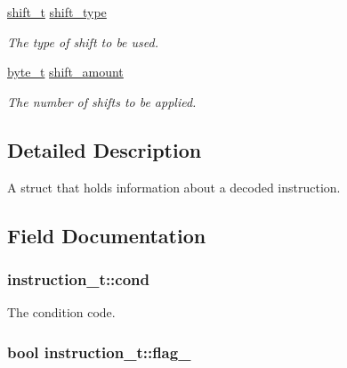 \begin{DoxyCompactItemize}
\hyperlink{global_8h_a22746cb89e8b2ed0a61876e36446f37f}{shift\+\_\+t} \hyperlink{structinstruction__t_a13483a9191b2197c4ed899f3889ad801}{shift\+\_\+type}
\begin{DoxyCompactList}\small\item\em The type of shift to be used. \end{DoxyCompactList}\item 
\hyperlink{global_8h_a0661d7d1353e0bca70c64563f635b034}{byte\+\_\+t} \hyperlink{structinstruction__t_ac6da93636b5b619f0ee7c5405b185e5d}{shift\+\_\+amount}
\begin{DoxyCompactList}\small\item\em The number of shifts to be applied. \end{DoxyCompactList}\end{DoxyCompactItemize}


\subsection{Detailed Description}
A struct that holds information about a decoded instruction. 

\subsection{Field Documentation}
\subsubsection[{\texorpdfstring{cond}{cond}}]{ instruction\+\_\+t\+::cond}\hypertarget{structinstruction__t_aafe48ca203b375c2b6373abd11192c3f}{}\label{structinstruction__t_aafe48ca203b375c2b6373abd11192c3f}


The condition code. 

\subsubsection[{\texorpdfstring{flag\+\_\+0}{flag_0}}]{\setlength{\rightskip}{0pt plus 5cm}bool instruction\+\_\+t\+::flag\+\_}\hypertarget{structinstruction__t_a2d1e7a105576c5bb98d45a51ef3d2e03}{}\label{structinstruction__t_a2d1e7a105576c5bb98d45a51ef3d2e03}


